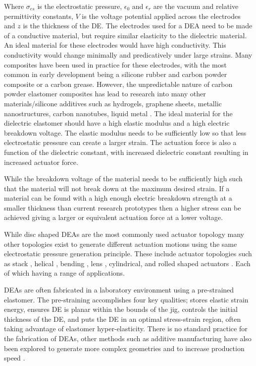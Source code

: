 Where $\sigma_{es}$ is the electrostatic pressure, $\epsilon_0$ and $\epsilon_r$ are the vacuum and relative permittivity constants, $V$ is the voltage potential applied across the electrodes and $z$ is the thickness of the DE. The electrodes used for a DEA need to be made of a conductive material, but require similar elasticity to the dielectric material. An ideal material for these electrodes would have high conductivity. This conductivity would change minimally and predicatively under large strains. Many composites have been used in practice for these electrodes, with the most common in early development being a silicone rubber and carbon powder composite or a carbon grease. However, the unpredictable nature of carbon powder elastomer composites has lead to research into many other materials/silicone additives such as hydrogels, graphene sheets, metallic nanostructures, carbon nanotubes, liquid metal \citep{Liu2013,Rogers2013,Bele2018,Quinsaat2015}. The ideal material for the dielectric elastomer should have a high elastic modulus and a high electric breakdown voltage. The elastic modulus needs to be sufficiently low so that less electrostatic pressure can create a larger strain. The actuation force is also a function of the dielectric constant, with increased dielectric constant resulting in increased actuator force.  

While the breakdown voltage of the material needs to be sufficiently high such that the material will not break down at the maximum desired strain. If a material can be found with a high enough electric breakdown strength at a smaller thickness than current research prototypes then a higher stress can be achieved giving a larger or equivalent actuation force at a lower voltage. 

While disc shaped DEAs are the most commonly used actuator topology many other topologies exist to generate different actuation motions using the same electrostatic pressure generation principle. These include actuator topologies such as stack \citep{Hau2018,Kovacs2009}, helical \citep{Carpi2012}, bending \citep{Pfeil2020}, lens \citep{Ghilardi2019}, cylindrical, and rolled shaped actuators \citep{Amin2018}. Each of which having a range of applications.

DEAs are often fabricated in a laboratory environment using a pre-strained elastomer. The pre-straining accomplishes four key qualities; stores elastic strain energy, ensures DE is planar within the bounds of the jig, controls the initial thickness of the DE, and puts the DE in an optimal stress-strain region, often taking advantage of elastomer hyper-elasticity. There is no standard practice for the fabrication of DEAs, other methods such as additive manufacturing have also been explored to generate more complex geometries and to increase production speed \citep{Park2018,McCoul2017}.

